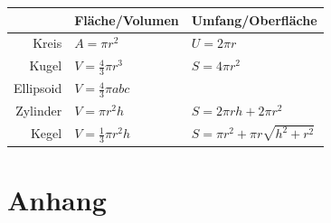 \documentclass[a4paper, fontsize = 8pt, landscape]{scrartcl}
\begin{document}
\begin{multicols*}{3}
    \begin{center}
        \renewcommand{\arraystretch}{1.5}
        \begin{tabular}{r l l} \toprule
                      & Fläche/Volumen              & Umfang/Oberfläche                      \\
            \midrule
            Kreis     & $A = \pi r^2$               & $U = 2 \pi r$                          \\
            Kugel     & $V = \frac{4}{3} \pi r^3$   & $S = 4 \pi r^2$                        \\
            Ellipsoid & $V = \frac{4}{3} \pi a b c$ &                                        \\
            Zylinder  & $V = \pi r^2 h $            & $S = 2\pi r h + 2\pi r^2$              \\
            Kegel     & $V = \frac{1}{3} \pi r^2 h$ & $S = \pi r^2 + \pi r \sqrt{h^2 + r^2}$ \\
            \bottomrule
        \end{tabular}
    \end{center}
    \section*{Anhang}


\end{multicols*}
\end{document}
